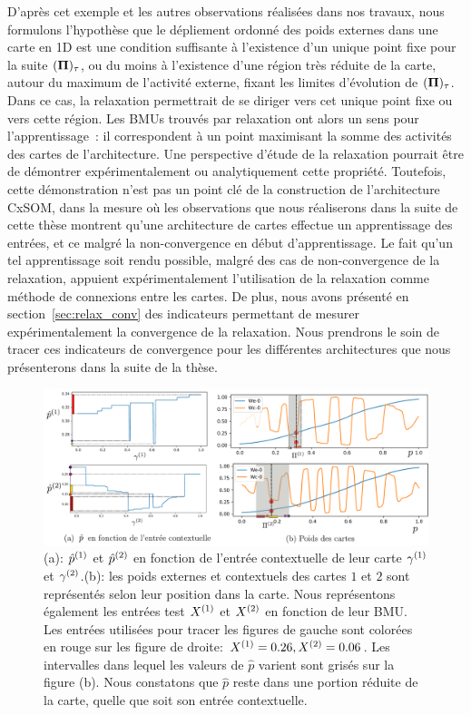 \documentclass[../main]{subfiles}
\begin{document}
D'après cet exemple et les autres observations réalisées dans nos travaux, nous formulons l'hypothèse que le dépliement ordonné des poids externes dans une carte en 1D est une condition suffisante à l'existence d'un unique point fixe pour la suite $(\mathbf{\Pi})_\tau$, ou du moins à l'existence d'une région très réduite de la carte, autour du maximum de l'activité externe, fixant les limites d'évolution de $(\mathbf{\Pi})_\tau$.
Dans ce cas, la relaxation permettrait de se diriger vers cet unique point fixe ou vers cette région.
Les BMUs trouvés par relaxation ont alors un sens pour l'apprentissage~: il correspondent à un point maximisant la somme des activités des cartes de l'architecture.
Une perspective d'étude de la relaxation pourrait être de démontrer expérimentalement ou analytiquement cette propriété. 
Toutefois, cette démonstration n'est pas un point clé de la construction de l'architecture CxSOM, dans la mesure où les observations que nous réaliserons dans la suite de cette thèse montrent qu'une architecture de cartes effectue un apprentissage des entrées, et ce malgré la non-convergence en début d'apprentissage. 
Le fait qu'un tel apprentissage soit rendu possible, malgré des cas de non-convergence de la relaxation, appuient expérimentalement l'utilisation de la relaxation comme méthode de connexions entre les cartes. 
De plus, nous avons présenté en section~\ref{sec:relax_conv} des indicateurs permettant de mesurer expérimentalement la convergence de la relaxation. Nous prendrons le soin de tracer ces indicateurs de convergence pour les différentes architectures que nous présenterons dans la suite de la thèse.


\begin{figure}
	\includegraphics[width=\textwidth]{am_w_006_noinp}
	\caption{(a): $\hat{p}^{({1})}$ et $\hat{p}^{({2})}$ en fonction de l'entrée contextuelle de leur carte $\gamma^{({1})}$ et $\gamma^{({2})}$.(b): les poids externes et contextuels des cartes $1$ et $2$ sont représentés selon leur position dans la carte. Nous représentons également les entrées test $X^{({1})}$ et $X^{({2})}$ en fonction de leur BMU. Les entrées utilisées pour tracer les figures de gauche sont colorées en rouge sur les figure de droite: $X^{({1})}=0.26,X^{({2})}=0.06$. Les intervalles dans lequel les valeurs de $\hat{p}$ varient sont grisés sur la figure (b). Nous constatons que $\hat{p}$ reste dans une portion réduite de la carte, quelle que soit son entrée contextuelle.}
	\label{fig:w006}
	\end{figure}
\end{document}
